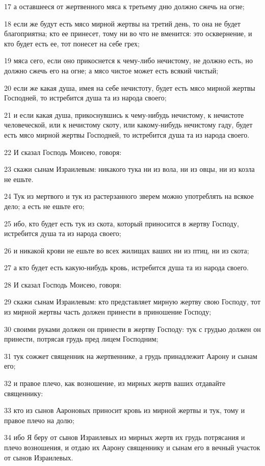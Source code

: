 \par 17 а оставшееся от жертвенного мяса к третьему дню должно сжечь на огне;
\par 18 если же будут есть мясо мирной жертвы на третий день, то она не будет благоприятна; кто ее принесет, тому ни во что не вменится: это осквернение, и кто будет есть ее, тот понесет на себе грех;
\par 19 мяса сего, если оно прикоснется к чему-либо нечистому, не должно есть, но должно сжечь его на огне; а мясо чистое может есть всякий чистый;
\par 20 если же какая душа, имея на себе нечистоту, будет есть мясо мирной жертвы Господней, то истребится душа та из народа своего;
\par 21 и если какая душа, прикоснувшись к чему-нибудь нечистому, к нечистоте человеческой, или к нечистому скоту, или какому-нибудь нечистому гаду, будет есть мясо мирной жертвы Господней, то истребится душа та из народа своего.
\par 22 И сказал Господь Моисею, говоря:
\par 23 скажи сынам Израилевым: никакого тука ни из вола, ни из овцы, ни из козла не ешьте.
\par 24 Тук из мертвого и тук из растерзанного зверем можно употреблять на всякое дело; а есть не ешьте его;
\par 25 ибо, кто будет есть тук из скота, который приносится в жертву Господу, истребится душа та из народа своего;
\par 26 и никакой крови не ешьте во всех жилищах ваших ни из птиц, ни из скота;
\par 27 а кто будет есть какую-нибудь кровь, истребится душа та из народа своего.
\par 28 И сказал Господь Моисею, говоря:
\par 29 скажи сынам Израилевым: кто представляет мирную жертву свою Господу, тот из мирной жертвы часть должен принести в приношение Господу;
\par 30 своими руками должен он принести в жертву Господу: тук с грудью должен он принести, потрясая грудь пред лицем Господним;
\par 31 тук сожжет священник на жертвеннике, а грудь принадлежит Аарону и сынам его;
\par 32 и правое плечо, как возношение, из мирных жертв ваших отдавайте священнику:
\par 33 кто из сынов Аароновых приносит кровь из мирной жертвы и тук, тому и правое плечо на долю;
\par 34 ибо Я беру от сынов Израилевых из мирных жертв их грудь потрясания и плечо возношения, и отдаю их Аарону священнику и сынам его в вечный участок от сынов Израилевых.
